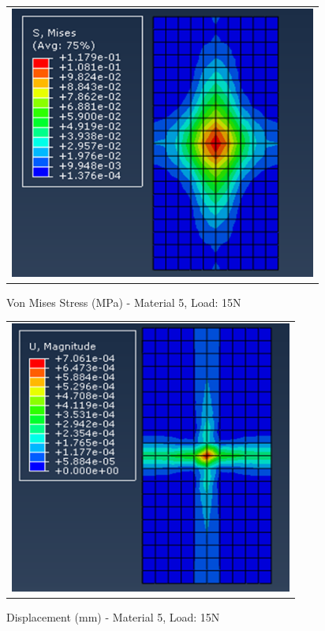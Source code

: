\documentclass[a4paper,12pt]{article}
\numberwithin{equation}{section}
\numberwithin{figure}{section}
\begin{document}
\begin{figure}[H]
  \centering
  \begin{tabular}{@{}c@{}}
    \includegraphics[width=0.7\linewidth,height=255pt]{Results/Point Loading/M5_VMS_L3.png} \\
  \end{tabular}
  \caption{Von Mises Stress (MPa) - Material 5, Load: 15N}
\end{figure}

\begin{figure}[H]
  \centering
  \begin{tabular}{@{}c@{}}
    \includegraphics[width=0.7\linewidth,height=255pt]{Results/Point Loading/M5_DIS_L3.png} \\
  \end{tabular}
  \caption{Displacement (mm) - Material 5, Load: 15N}
\end{figure}
\end{document}
